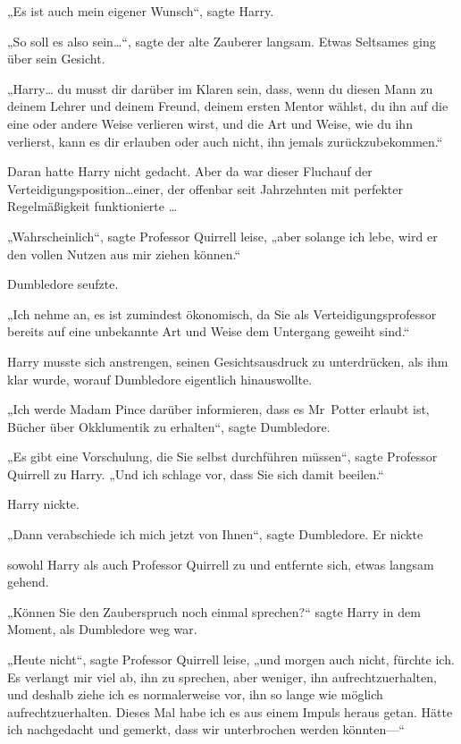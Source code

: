 {„Es ist auch mein eigener Wunsch“, sagte Harry.

„So soll es also sein…“, sagte der alte Zauberer langsam. Etwas Seltsames ging über sein Gesicht.

„Harry… du musst dir darüber im Klaren sein, dass, wenn du diesen Mann zu deinem Lehrer und deinem Freund, deinem ersten Mentor wählst, du ihn auf die eine oder andere Weise verlieren wirst, und die Art und Weise, wie du ihn verlierst, kann es dir erlauben oder auch nicht, ihn jemals zurückzubekommen.“

Daran hatte Harry nicht gedacht. Aber da war dieser Fluchauf der Verteidigungsposition…einer, der offenbar seit Jahrzehnten mit perfekter Regelmäßigkeit funktionierte …

„Wahrscheinlich“, sagte Professor Quirrell leise, „aber solange ich lebe, wird er den vollen Nutzen aus mir ziehen können.“

Dumbledore seufzte.

„Ich nehme an, es ist zumindest ökonomisch, da Sie als Verteidigungsprofessor bereits auf eine unbekannte Art und Weise dem Untergang geweiht sind.“

Harry musste sich anstrengen, seinen Gesichtsausdruck zu unterdrücken, als ihm klar wurde, worauf Dumbledore eigentlich hinauswollte.

„Ich werde Madam Pince darüber informieren, dass es Mr~Potter erlaubt ist, Bücher über Okklumentik zu erhalten“, sagte Dumbledore.

„Es gibt eine Vorschulung, die Sie selbst durchführen müssen“, sagte Professor Quirrell zu Harry. „Und ich schlage vor, dass Sie sich damit beeilen.“

Harry nickte.

„Dann verabschiede ich mich jetzt von Ihnen“, sagte Dumbledore. Er nickte

sowohl Harry als auch Professor Quirrell zu und entfernte sich, etwas langsam gehend.

„Können Sie den Zauberspruch noch einmal sprechen?“ sagte Harry in dem Moment, als Dumbledore weg war.

„Heute nicht“, sagte Professor Quirrell leise, „und morgen auch nicht, fürchte ich. Es verlangt mir viel ab, ihn zu sprechen, aber weniger, ihn aufrechtzuerhalten, und deshalb ziehe ich es normalerweise vor, ihn so lange wie möglich aufrechtzuerhalten. Dieses Mal habe ich es aus einem Impuls heraus getan. Hätte ich nachgedacht und gemerkt, dass wir unterbrochen werden könnten—“

}
